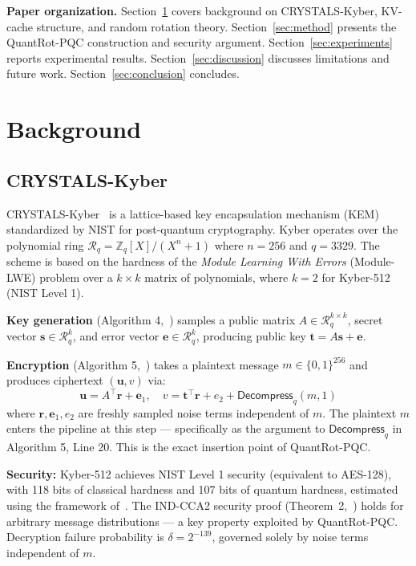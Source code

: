 \documentclass[preprint,a4paper]{article}
\begin{document}
\textbf{Paper organization.}
Section~\ref{sec:background} covers background
on CRYSTALS-Kyber, KV-cache structure, and
random rotation theory.
Section~\ref{sec:method} presents the
QuantRot-PQC construction and security argument.
Section~\ref{sec:experiments} reports experimental
results.
Section~\ref{sec:discussion} discusses limitations
and future work.
Section~\ref{sec:conclusion} concludes.

\section{Background}
\label{sec:background}
\subsection{CRYSTALS-Kyber}
\label{sec:kyber}

CRYSTALS-Kyber~\cite{kyber2021} is a lattice-based key
encapsulation mechanism (KEM) standardized by NIST for
post-quantum cryptography. Kyber operates over the
polynomial ring $\mathcal{R}_q = \mathbb{Z}_q[X]/(X^n+1)$
where $n = 256$ and $q = 3329$. The scheme is based on
the hardness of the \emph{Module Learning With Errors}
(Module-LWE) problem over a $k \times k$ matrix of
polynomials, where $k = 2$ for Kyber-512 (NIST Level 1).

\textbf{Key generation} (Algorithm 4,~\cite{kyber2021})
samples a public matrix $A \in \mathcal{R}_q^{k \times k}$,
secret vector $\mathbf{s} \in \mathcal{R}_q^k$, and
error vector $\mathbf{e} \in \mathcal{R}_q^k$, producing
public key $\mathbf{t} = A\mathbf{s} + \mathbf{e}$.

\textbf{Encryption} (Algorithm 5,~\cite{kyber2021})
takes a plaintext message $m \in \{0,1\}^{256}$ and
produces ciphertext $(\mathbf{u}, v)$ via:
\[
    \mathbf{u} = A^\top \mathbf{r} + \mathbf{e}_1,
    \quad
    v = \mathbf{t}^\top \mathbf{r} + e_2 +
    \mathsf{Decompress}_q(m, 1)
\]
where $\mathbf{r}, \mathbf{e}_1, e_2$ are freshly sampled
noise terms independent of $m$. The plaintext $m$ enters
the pipeline at this step --- specifically as the argument
to $\mathsf{Decompress}_q$ in Algorithm 5, Line 20.
This is the exact insertion point of QuantRot-PQC.

\textbf{Security:} Kyber-512 achieves NIST Level 1
security (equivalent to AES-128), with 118 bits of
classical hardness and 107 bits of quantum hardness,
estimated using the framework of~\cite{albrecht2015}.
The IND-CCA2 security proof (Theorem~2,~\cite{kyber2021})
holds for arbitrary message distributions --- a key
property exploited by QuantRot-PQC.
Decryption failure probability is $\delta = 2^{-139}$,
governed solely by noise terms independent of $m$.
\end{document}
